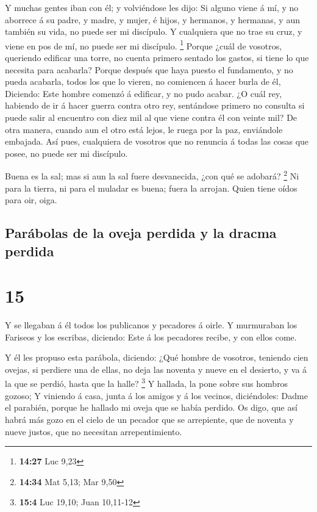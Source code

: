  Y muchas gentes iban con él; y volviéndose les dijo:
 Si alguno viene á mí, y no aborrece á su padre, y madre, y
mujer, é hijos, y hermanos, y hermanas, y aun también su vida, no puede
ser mi discípulo.  Y cualquiera que no trae su cruz, y
viene en pos de mí, no puede ser mi discípulo. \footnote{\textbf{14:27}
  Luc 9,23}  Porque ¿cuál de vosotros, queriendo edificar
una torre, no cuenta primero sentado los gastos, si tiene lo que
necesita para acabarla?  Porque después que haya puesto el
fundamento, y no pueda acabarla, todos los que lo vieren, no comiencen á
hacer burla de él,  Diciendo: Este hombre comenzó á
edificar, y no pudo acabar.  ¿O cuál rey, habiendo de ir á
hacer guerra contra otro rey, sentándose primero no consulta si puede
salir al encuentro con diez mil al que viene contra él con veinte mil?
 De otra manera, cuando aun el otro está lejos, le ruega
por la paz, enviándole embajada.  Así pues, cualquiera de
vosotros que no renuncia á todas las cosas que posee, no puede ser mi
discípulo.

 Buena es la sal; mas si aun la sal fuere desvanecida, ¿con
qué se adobará? \footnote{\textbf{14:34} Mat 5,13; Mar 9,50}
 Ni para la tierra, ni para el muladar es buena; fuera la
arrojan. Quien tiene oídos para oir, oiga.

\hypertarget{paruxe1bolas-de-la-oveja-perdida-y-la-dracma-perdida}{%
\subsection{Parábolas de la oveja perdida y la dracma
perdida}\label{paruxe1bolas-de-la-oveja-perdida-y-la-dracma-perdida}}

\hypertarget{section-14}{%
\section{15}\label{section-14}}

 Y se llegaban á él todos los publicanos y pecadores á
oirle.  Y murmuraban los Fariseos y los escribas, diciendo:
Este á los pecadores recibe, y con ellos come.

 Y él les propuso esta parábola, diciendo:  ¿Qué
hombre de vosotros, teniendo cien ovejas, si perdiere una de ellas, no
deja las noventa y nueve en el desierto, y va á la que se perdió, hasta
que la halle? \footnote{\textbf{15:4} Luc 19,10; Juan 10,11-12}
 Y hallada, la pone sobre sus hombros gozoso;  Y
viniendo á casa, junta á los amigos y á los vecinos, diciéndoles: Dadme
el parabién, porque he hallado mi oveja que se había perdido.
 Os digo, que así habrá más gozo en el cielo de un pecador
que se arrepiente, que de noventa y nueve justos, que no necesitan
arrepentimiento.

